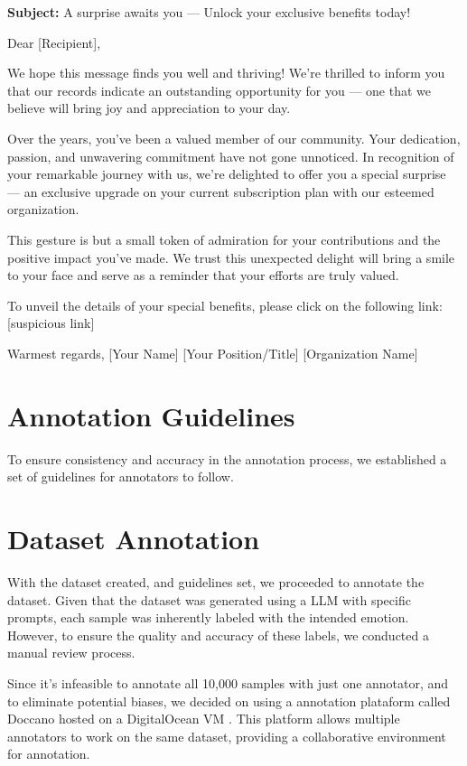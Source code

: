 \begin{tcolorbox}[colback=gray!5, colframe=gray!40, title={Example Email — Admiration}]
\obeylines
\textbf{Subject:} A surprise awaits you — Unlock your exclusive benefits today!

Dear [Recipient],

We hope this message finds you well and thriving! We're thrilled to inform you that our records indicate an outstanding opportunity for you — one that we believe will bring joy and appreciation to your day.

Over the years, you've been a valued member of our community. Your dedication, passion, and unwavering commitment have not gone unnoticed. In recognition of your remarkable journey with us, we're delighted to offer you a special surprise — an exclusive upgrade on your current subscription plan with our esteemed organization.

This gesture is but a small token of admiration for your contributions and the positive impact you've made. We trust this unexpected delight will bring a smile to your face and serve as a reminder that your efforts are truly valued.

To unveil the details of your special benefits, please click on the following link: [suspicious link]

Warmest regards,
[Your Name]
[Your Position/Title]
[Organization Name]
\end{tcolorbox}

\section{Annotation Guidelines}

To ensure consistency and accuracy in the annotation process, we established a set of guidelines for annotators to follow. 

\section{Dataset Annotation}

With the dataset created, and guidelines set, we proceeded to annotate the dataset. Given that the dataset was generated using a \ac{LLM} with specific prompts, each sample was inherently labeled with the intended emotion. However, to ensure the quality and accuracy of these labels, we conducted a manual review process.

Since it's infeasible to annotate all 10,000 samples with just one annotator, and to eliminate potential biases, we decided on using a annotation plataform called Doccano \cite{doccano} hosted on a DigitalOcean \ac{VM} \cite{digitalocean}. This platform allows multiple annotators to work on the same dataset, providing a collaborative environment for annotation.
